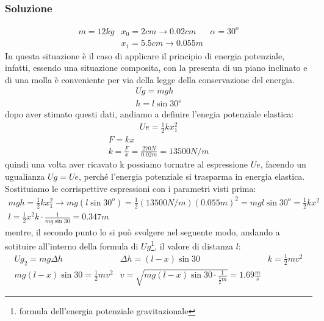 \documentclass{report}
\begin{document}
\begin{enumerate}
\subsubsection{Soluzione}
\label{sec:sol11}
\begin{eqnarray*}
  m=12kg & x_0=2cm\to 0.02cm & \alpha=30^o\\
  & x_1=5.5cm \to 0.055m 
\end{eqnarray*}
In questa situazione è il caso di applicare il principio di energia potenziale,
infatti, essendo una situazione composita, con la presenta di un piano inclinato e
di una molla è conveniente per via della legge della conservazione del energia.
\begin{eqnarray*}
  Ug=mgh\\
  h=l\sin30^o
\end{eqnarray*}
dopo aver stimato questi dati, andiamo a definire l'enegia potenziale elastica:
\begin{eqnarray*}
  Ue=\frac{1}{2}kx_1^2
\end{eqnarray*}
\begin{eqnarray*}
  F=kx\\
  k=\frac{F}{x}=\frac{270N}{0.02m}=13500N/m
\end{eqnarray*}
quindi una volta aver ricavato k possiamo tornatre al espressione $Ue$, facendo un ugualianza $Ug=Ue$, perché l'energia potenziale si trasparma in energia elastica. Sostituiamo le corrispettive espressioni con i parametri visti prima:
\begin{eqnarray*}
  mgh=\frac{1}{2}kx_1^2\to mg(l\sin30^o)=\frac{1}{2}(13500N/m)(0.055m)^2=mgl\sin30^o=\frac{1}{2}kx^2\\
  l=\frac{1}{2}x^2k\cdot \frac{1}{mg\sin 30} =0.347m
\end{eqnarray*}
mentre, il secondo punto lo si può svolgere nel seguente modo, andando a sotituire
all'interno della formula di $Ug$\footnote{formula dell'energia potenziale
  gravitazionale}, il valore di distanza $l$:
\begin{eqnarray*}
  Ug_2=mg\Delta h & \Delta h= (l-x)\sin30 & k=\frac{1}{2}mv^2\\
  mg(l-x)\sin 30 = \frac{1}{2}mv^2 & v=\sqrt{mg(l-x)\sin 30\cdot\frac{1}{\frac{1}{2}m}}=1.69\frac{m}{s}
\end{eqnarray*}

\end{enumerate}
\end{document}
